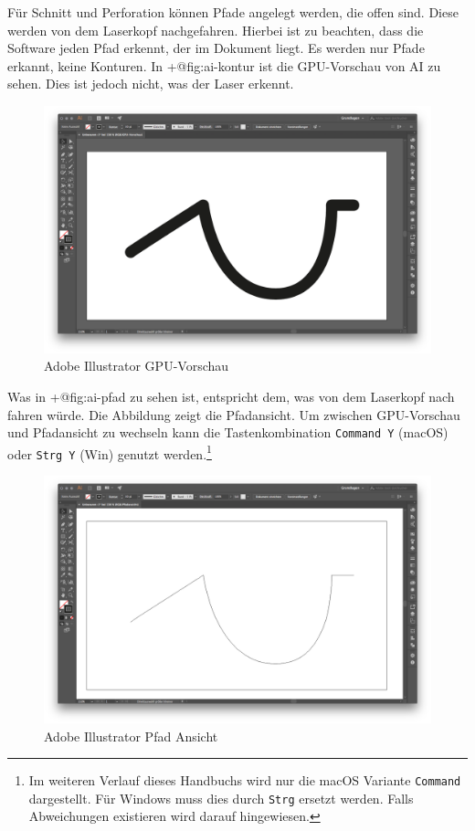 \documentclass[]{article}
\begin{document}
Für Schnitt und Perforation können Pfade angelegt werden, die offen
sind. Diese werden von dem Laserkopf nachgefahren. Hierbei ist zu
beachten, dass die Software jeden Pfad erkennt, der im Dokument liegt.
Es werden nur Pfade erkannt, keine Konturen. In +@fig:ai-kontur ist die
GPU-Vorschau von AI zu sehen. Dies ist jedoch nicht, was der Laser
erkennt.

\begin{figure}
\hypertarget{fig:ai-kontur}{%
\centering
\includegraphics{assets/images/ai-kontur.png}
\caption{Adobe Illustrator GPU-Vorschau}\label{fig:ai-kontur}
}
\end{figure}

Was in +@fig:ai-pfad zu sehen ist, entspricht dem, was von dem Laserkopf
nach fahren würde. Die Abbildung zeigt die Pfadansicht. Um zwischen
GPU-Vorschau und Pfadansicht zu wechseln kann die Tastenkombination
\texttt{Command\ Y} (macOS) oder \texttt{Strg\ Y} (Win) genutzt
werden.\footnote{Im weiteren Verlauf dieses Handbuchs wird nur die macOS
  Variante \texttt{Command} dargestellt. Für Windows muss dies durch
  \texttt{Strg} ersetzt werden. Falls Abweichungen existieren wird
  darauf hingewiesen.}

\begin{figure}
\hypertarget{fig:ai-pfad}{%
\centering
\includegraphics{assets/images/ai-pfad.png}
\caption{Adobe Illustrator Pfad Ansicht}\label{fig:ai-pfad}
}
\end{figure}
\end{document}
